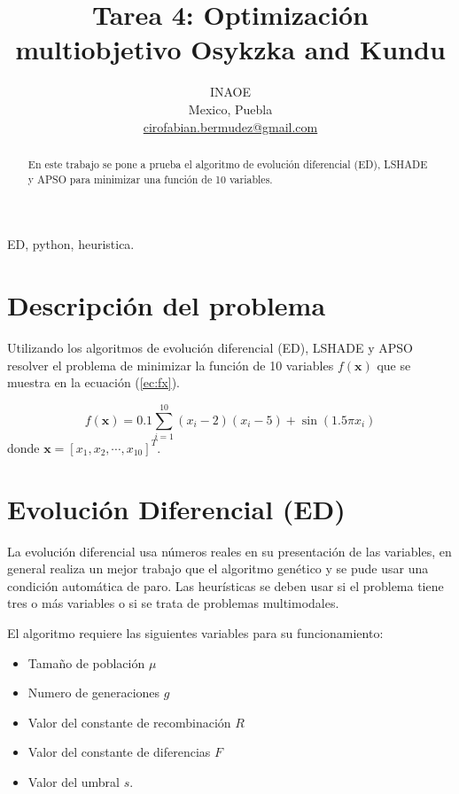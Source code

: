 \documentclass[conference]{IEEEtran}
\begin{document}
\title{Tarea 4: Optimización multiobjetivo Osykzka and Kundu
}

\author{
INAOE\\
Mexico, Puebla \\
\url{cirofabian.bermudez@gmail.com}
}

\maketitle

\begin{abstract}
En este trabajo se pone a prueba el algoritmo de evolución diferencial (ED), LSHADE y APSO para minimizar una función de 10 variables. 
\end{abstract}

\begin{IEEEkeywords}
ED, python, heuristica.
\end{IEEEkeywords}

\section{Descripción del problema}

Utilizando los algoritmos de evolución diferencial (ED), LSHADE y APSO resolver el problema de minimizar la función de 10 variables $f(\mathbf{x})$ que se muestra en la ecuación (\ref{ec:fx}).

\begin{equation}
 f(\mathbf{x}) = 0.1 \sum_{i=1} ^{10} (x_{i} -2)(x_{i} -5) + \sin(1.5 \pi x_{i})
 \label{ec:fx}
\end{equation} 
donde $\mathbf{x} = \left[ x_{1}, x_{2}, \cdots, x_{10} \right]^{T}$.


\section{Evolución Diferencial (ED)}

La evolución diferencial usa números reales en su presentación de las variables, en general realiza un mejor trabajo que el algoritmo genético y se pude usar una condición automática de paro. 
Las heurísticas se deben usar si el problema tiene tres o más variables o si se trata de problemas multimodales.

El algoritmo requiere las siguientes variables para su funcionamiento:
\begin{itemize}
\item Tamaño de población $\mu$
\item Numero de generaciones $g$
\item Valor del constante de recombinación $R$
\item Valor del constante de diferencias $F$
\item Valor del umbral $s$.
\end{itemize}
\end{document}
